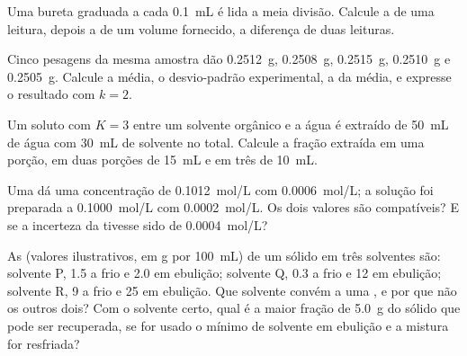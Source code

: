 \begin{exercise}[$\star$]\label{exo:b1:lab-techniques-1:4}
Uma bureta graduada a cada \qty{0.1}{mL} é lida a meia divisão. Calcule a
 de uma leitura, depois a de um volume fornecido, a
diferença de duas leituras.
\end{exercise}

\begin{exercise}[$\star\star$]\label{exo:b1:lab-techniques-1:5}
Cinco pesagens da mesma amostra dão \qty{0.2512}{g}, \qty{0.2508}{g},
\qty{0.2515}{g}, \qty{0.2510}{g} e \qty{0.2505}{g}. Calcule a média, o
desvio-padrão experimental, a  da média, e expresse o
resultado com $k = 2$.
\end{exercise}

\begin{exercise}[$\star\star$]\label{exo:b1:lab-techniques-1:6}
Um soluto com  $K = 3$ entre um solvente orgânico e
a água é extraído de \qty{50}{mL} de água com \qty{30}{mL} de solvente no
total. Calcule a fração extraída em uma porção, em duas porções de
\qty{15}{mL} e em três de \qty{10}{mL}.
\end{exercise}

\begin{exercise}[$\star\star$]\label{exo:b1:lab-techniques-1:7}
Uma  dá uma concentração de \qty{0.1012}{mol/L} com 
\qty{0.0006}{mol/L}; a solução foi preparada a \qty{0.1000}{mol/L} com
 \qty{0.0002}{mol/L}. Os dois valores são compatíveis? E
se a incerteza da  tivesse sido de
\qty{0.0004}{mol/L}?
\end{exercise}

\begin{exercise}[$\star\star$]\label{exo:b1:lab-techniques-1:8}
As  (valores ilustrativos, em \unit{g} por \qty{100}{mL}) de
um sólido em três solventes são: solvente P, 1.5 a frio e 2.0 em
ebulição; solvente Q, 0.3 a frio e 12 em ebulição; solvente R, 9 a frio e
25 em ebulição. Que solvente convém a uma , e por que não
os outros dois? Com o solvente certo, qual é a maior fração de
\qty{5.0}{g} do sólido que pode ser recuperada, se for usado o mínimo de
solvente em ebulição e a mistura for resfriada?
\end{exercise}

